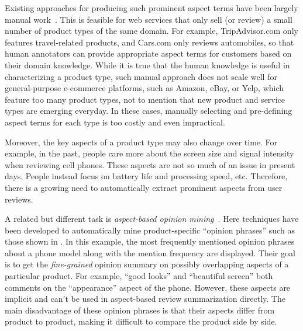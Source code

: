 
Existing approaches for producing such prominent aspect terms have been
largely manual work~\cite{poria2014rule,qiu2011opinion}. This is feasible for web services that only 
sell (or review) a small number of  product types of the same domain. 
For example, TripAdvisor.com only features travel-related products, 
and Cars.com only reviews automobiles, so that human annotators can provide 
appropriate aspect terms for customers based on their domain knowledge.  
While it is true that the human knowledge is useful
in characterizing a product type,
such manual approach does not scale well for 
general-purpose e-commerce platforms, such as Amazon, eBay,  
or Yelp, which feature too many product types, 
not to mention that new product and service types are emerging 
everyday.  
In these cases, manually selecting and pre-defining 
aspect terms for each type is too costly and even impractical.

Moreover, the key aspects of a product type may also change over time. 
For example, in the past, people care more about the screen 
size and signal intensity when reviewing cell phones. 
These aspects are not so much of an issue in present days. 
People instead focus on battery life and processing speed, etc.
Therefore, there is a growing need to automatically extract prominent 
aspects from user reviews.


%

A related but different task is \textit{aspect-based opinion 
mining}~\cite{su2008hidden,zeng2013classification}. 
Here techniques have been developed to automatically mine
product-specific ``opinion phrases'' such as those shown in 
.
In this example, the most frequently mentioned opinion phrases
about a phone model along with the mention frequency
are displayed. 
Their goal is to get the {\em fine-grained} opinion summary on
possibly overlapping aspects of a particular product.
For example, ``good looks'' and ``beautiful screen'' both comments
on the ``appearance'' aspect of the phone. However, these aspects
are implicit and can't be used in aspect-based review summarization
directly. The main disadvantage of these opinion phrases is that
their aspects differ from product to product, making it difficult to
compare the product side by side. 

